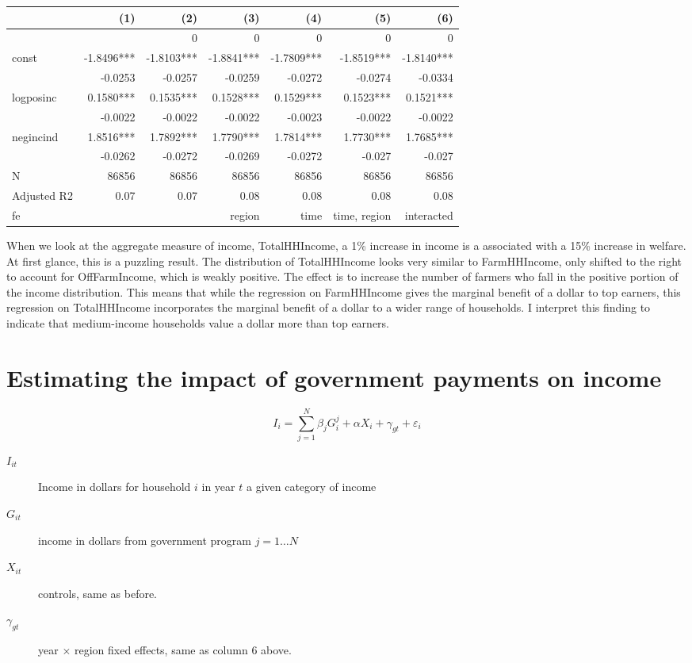 \documentclass[11pt]{article}
\begin{document}
\begin{center}
\begin{tabular}{lrrrrrr}
\hline
 & (1) & (2) & (3) & (4) & (5) & (6)\\[0pt]
\hline
 &  & 0 & 0 & 0 & 0 & 0\\[0pt]
const & -1.8496*** & -1.8103*** & -1.8841*** & -1.7809*** & -1.8519*** & -1.8140***\\[0pt]
 & -0.0253 & -0.0257 & -0.0259 & -0.0272 & -0.0274 & -0.0334\\[0pt]
logposinc & 0.1580*** & 0.1535*** & 0.1528*** & 0.1529*** & 0.1523*** & 0.1521***\\[0pt]
 & -0.0022 & -0.0022 & -0.0022 & -0.0023 & -0.0022 & -0.0022\\[0pt]
negincind & 1.8516*** & 1.7892*** & 1.7790*** & 1.7814*** & 1.7730*** & 1.7685***\\[0pt]
 & -0.0262 & -0.0272 & -0.0269 & -0.0272 & -0.027 & -0.027\\[0pt]
N & 86856 & 86856 & 86856 & 86856 & 86856 & 86856\\[0pt]
Adjusted R2 & 0.07 & 0.07 & 0.08 & 0.08 & 0.08 & 0.08\\[0pt]
fe &  &  & region & time & time, region & interacted\\[0pt]
\end{tabular}
\end{center}

When we look at the aggregate measure of income, TotalHHIncome, a 1\% increase in income is a associated with a 15\% increase in welfare. At first glance, this is a puzzling result. The distribution of TotalHHIncome looks very similar to FarmHHIncome, only shifted to the right to account for OffFarmIncome, which is weakly positive. The effect is to increase the number of farmers who fall in the positive portion of the income distribution. This means that while the regression on FarmHHIncome gives the marginal benefit of a dollar to top earners, this regression on TotalHHIncome incorporates the marginal benefit of a dollar to a wider range of households. I interpret this finding to indicate that medium-income households value a dollar more than top earners.


\section{Estimating the impact of government payments on income}
\label{sec:org2fc5b7f}
\[
I_{i} = \sum_{j=1}^{N} \beta_{j} G_{i}^{j} + \alpha X_{i} + \gamma_{gt} + \varepsilon_{i}
\]
\begin{description}
\item[{\(I_{it}\)}] Income in dollars for household \(i\) in year \(t\) a given category of income
\item[{\(G_{it}\)}] income in dollars from government program \(j = 1 \dots N\)
\item[{\(X_{it}\)}] controls, same as before.
\item[{\(\gamma_{gt}\)}] year \(\times\) region fixed effects, same as column 6 above.
\end{description}
\end{document}
